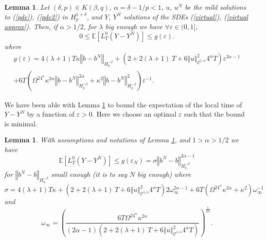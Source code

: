 \documentclass[11pt]{enstaPRE}
\newtheorem{lem}[theo]{Lemma}
\newcommand{\norme}[1]{\left\Vert #1\right\Vert}
\newcommand{\E}{\mathbb{E}}
\begin{document}
\begin{lem}\label{local time}
    Let $(\delta,p)\in K(\beta,q)$, $\alpha=\delta-1/p<1$, $u$, $u^N$ be the mild solutions to (\ref{pde}), (\ref{pde2}) in $H_p^{1+\delta}$, and $Y$, $Y^N$ solutions of the SDEs (\ref{virtual}), (\ref{virtual approx}).  Then, if $\alpha>1/2$, for $\lambda$ big enough we have $\forall\varepsilon\in(0,1]$,
    \begin{equation}
    0\leq \E\left[L^0_T(Y-Y^N)\right]\leq  g(\varepsilon).
    \end{equation}
    where \begin{multline}
    g(\varepsilon) = 4(\lambda + 1)T\kappa\norme{b-b^N}_{H^{-\beta}_{q}} + \left(2 + 2(\lambda + 1)\ T + 6\norme{u}_{\mathcal{C}^{1,\alpha}}^2 4^{\alpha}T\right) \varepsilon^{2\alpha-1} \\ + 6T\left(\Omega^24^{\alpha}\kappa^{2\alpha} \norme{b-b^N}_{H^{-\beta}_q}^{2\alpha}+\kappa^2\norme{b-b^N}_{H^{-\beta}_{q}}^2\right)\varepsilon^{-1}.
    \end{multline}
    
\end{lem}

We have been able with Lemma \ref{local time} to bound the expectation of the local time of $Y-Y^N$ by a function of $\varepsilon>0$. Here we choose an optimal $\varepsilon$ such that the bound is minimal.

\begin{lem}\label{key lemma}
    With assumptions and notations of Lemma \ref{local time}, and $1>\alpha>1/2$ we have
    \begin{equation}
    \E\left[L^0_T(Y-Y^N)\right]\leq g(\varepsilon_N) = \sigma\norme{b^N-b}_{H^{-\beta}_{q}}^{2\alpha-1}
    \end{equation}
    for $\norme{b^N-b}_{H^{-\beta}_{q}}$ small enough (it is to say $N$ big enough) where \begin{equation*}
    \sigma = 4(\lambda + 1)T\kappa + \left(2 + 2(\lambda + 1)\ T + 6\norme{u}_{\mathcal{C}^{1,\alpha}}^2 4^{\alpha}T\right) 2\omega_\infty^{2\alpha-1} + 6T\left(\Omega^24^{\alpha}\kappa^{2\alpha} +\kappa^2\right)\omega_\infty^{-1}
    \end{equation*} and \begin{equation*}
    \omega_\infty=\left(\frac{6T\Omega^24^{\alpha}\kappa^{2\alpha} }{(2\alpha-1)\left(2 + 2(\lambda + 1)\ T + 6\norme{u}_{\mathcal{C}^{1,\alpha}}^2 4^{\alpha}T\right)}\right)^{\frac{1}{2\alpha}}.
    \end{equation*}
\end{lem}
\end{document}
